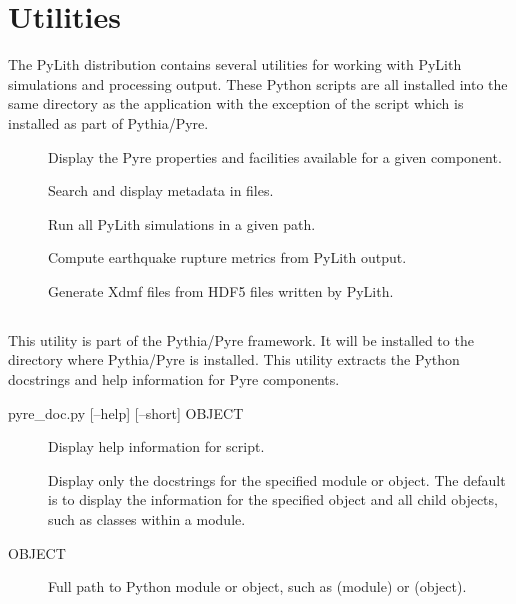 \section{Utilities}
\label{sec:runpylith:utilities}

The PyLith distribution contains several utilities for working with PyLith simulations and processing output.
These Python scripts are all installed into the same  directory as the  application with the exception of the  script which is installed as part of Pythia/Pyre.

\begin{description}
  \item[] Display the Pyre properties and facilities available for a given component.
  \item[] Search and display metadata in  files.
  \item[] Run all PyLith simulations in a given path.
  \item[] Compute earthquake rupture metrics from PyLith output.
  \item[] Generate Xdmf files from HDF5 files written by PyLith.
\end{description}
  
\subsection{}

This utility is part of the Pythia/Pyre framework.
It will be installed to the  directory where Pythia/Pyre is installed.
This utility extracts the Python docstrings and help information for Pyre components.


\begin{shell}
pyre_doc.py [--help] [--short] OBJECT
\end{shell}

\begin{description}
\item[] Display help information for script.
\item[] Display only the docstrings for the specified module or object. The default is to display the information for the specified object and all child objects, such as classes within a module.
\item[OBJECT] Full path to Python module or object, such as  (module) or  (object).
\end{description}


